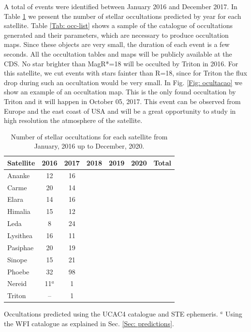 \documentclass[useAMS,usenatbib]{mn2e}
\begin{document}
A total of \noccs events were identified between January 2016 and December 2017. In Table \ref{Tab: satellite-occultation} we present the number of stellar occultations predicted by year for each satellite. Table \ref{Tab: occ-list} shows a sample of the catalogue of occultations generated and their parameters, which are necessary to produce occultation maps. Since these objects are very small, the duration of each event is a few seconds. All the occultation tables and maps will be publicly available at the CDS. No star brighter than MagR*=18 will be occulted by Triton in 2016. For this satellite, we cut events with stars fainter than R=18, since for Triton the flux drop during such an occultation would be very small. In Fig. \ref{Fig: ocultacao} we show an example of an occultation map. This is the only found occultation by Triton and it will happen in October 05, 2017. This event can be observed from Europe and the east coast of USA and will be a great opportunity to study in high resolution the atmosphere of the satellite.

\begin{table}
\caption{\label{Tab: satellite-occultation} Number of stellar occultations for each satellite from January, 2016 up to December, 2020.}
\begin{centering}
\begin{tabular}{lcccccc}
\hline  \hline
Satellite  & 2016 & 2017 & 2018 & 2019 & 2020 & Total \tabularnewline
\hline
Ananke & 12 & 16 & & & &  \tabularnewline
Carme & 20 & 14 & & & &  \tabularnewline
Elara & 14 & 16 & & & &  \tabularnewline
Himalia & 15 & 12 & & & &  \tabularnewline
Leda & 8 & 24 & & & &  \tabularnewline
Lysithea & 16 & 11 & & & &  \tabularnewline
Pasiphae & 20 & 19 & & & &  \tabularnewline
Sinope & 15 & 21 & & & &  \tabularnewline
\hdashline
Phoebe & 32 & 98 & & & &  \tabularnewline
\hdashline
Nereid & 11$^{a}$ & 1 & & & &  \tabularnewline
Triton & -- & 1 & & & &  \tabularnewline
\hline
\end{tabular}
\par \end{centering}
Occultations predicted using the UCAC4 catalogue and STE ephemeris.
$^{a}$ {Using the WFI catalogue as explained in Sec. \ref{Sec: predictions}}.
\end{table}
\end{document}
